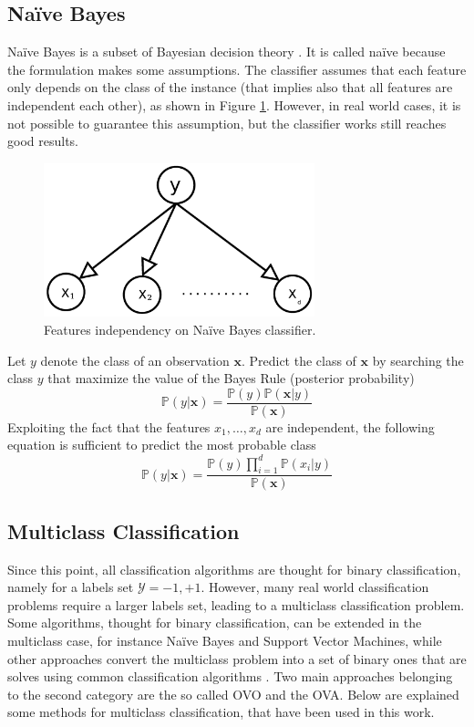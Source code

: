 \subsection{Na{\"i}ve Bayes}

Na{\"i}ve Bayes is a subset of Bayesian decision theory \cite{Taheri:2013:LNB:3062637.3062651}. It is called na{\"i}ve because the formulation makes some assumptions. The classifier assumes that each feature only depends on the class of the instance (that implies also that all features are independent each other), as shown in Figure \ref{fig:naive-bayes}. However, in real world cases, it is not possible to guarantee this assumption, but the classifier works still reaches good results.\\

\begin{figure}[ht]
	\centering
	\includegraphics[width=0.7\textwidth]{figures/naive-bayes.png}
	\caption{Features independency on Na{\"i}ve Bayes classifier.}
	\label{fig:naive-bayes}
\end{figure}

Let $y$ denote the class of an observation $\mathbf{x}$. Predict the class of $\mathbf{x}$ by searching the class $y$ that maximize the value of the Bayes Rule (posterior probability)
\[ \mathbb{P}(y | \mathbf{x}) = \frac{\mathbb{P}(y)\mathbb{P}(\mathbf{x} | y)}{\mathbb{P}(\mathbf{x})} \]
Exploiting  the fact that the features $x_1, \dots, x_d$ are independent, the following equation is sufficient to predict the most probable class
\[ \mathbb{P}(y | \mathbf{x}) = \frac{\mathbb{P}(y)\prod_{i=1}^{d}\mathbb{P}(x_i | y) }{\mathbb{P}(\mathbf{x})} \]





\subsection{Multiclass Classification}

Since this point, all classification algorithms are thought for binary classification, namely for a labels set $\mathcal{Y}={-1, +1}$. However, many real world classification problems require a larger labels set, leading to a multiclass classification problem. Some algorithms, thought for binary classification, can be extended in the multiclass case, for instance Na{\"i}ve Bayes and Support Vector Machines, while other approaches convert the multiclass problem into a set of binary ones that are solves using common classification algorithms \cite{Aly05surveyon}. Two main approaches belonging to the second category are the so called \ac{OVO} and the \ac{OVA}. Below are explained some methods for multiclass classification, that have been used in this work.

